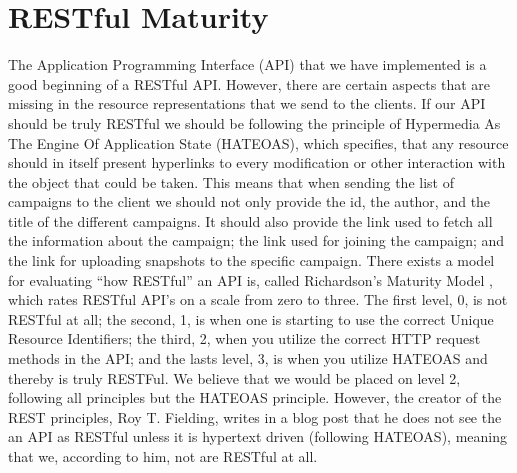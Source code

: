 
\section{RESTful Maturity}
\label{sec:restful_maturity}

The Application Programming Interface (API) that we have implemented is a good beginning of a RESTful API. However, there are certain aspects that are missing in the resource representations that we send to the clients. If our API should be truly RESTful we should be following the principle of Hypermedia As The Engine Of Application State (HATEOAS), which specifies, that any resource should in itself present hyperlinks to every modification or other interaction with the object that could be taken. This means that when sending the list of campaigns to the client we should not only provide the id, the author, and the title of the different campaigns. It should also provide the link used to fetch all the information about the campaign; the link used for joining the campaign; and the link for uploading snapshots to the specific campaign. There exists a model for evaluating ``how RESTful'' an API is, called Richardson's Maturity Model \parencite{richardsons_model}, which rates RESTful API's on a scale from zero to three. The first level, 0, is not RESTful at all; the second, 1, is when one is starting to use the correct Unique
Resource Identifiers; the third, 2, when you utilize the correct HTTP request methods in the API; and the lasts level, 3, is when you utilize HATEOAS and thereby is truly RESTFul. We believe that we would be placed on level 2, following all principles but the HATEOAS principle. However, the creator of the REST principles, Roy T. Fielding, writes in a blog post that he does not see the an API as RESTful unless it is hypertext driven (following HATEOAS)\parencite{http_manden_blog}, meaning that we, according to him, not are RESTful at all. 